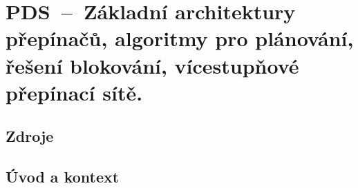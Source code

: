 

\graphicspath{{pds/prepinace/figures}}


\chapter{PDS~--~Základní architektury přepínačů, algoritmy pro plánování, řešení blokování, vícestupňové přepínací sítě.}



\section{Zdroje}

\begin{compactitem}
    \item {}
    \item {}
\end{compactitem}


\section{Úvod a kontext}

